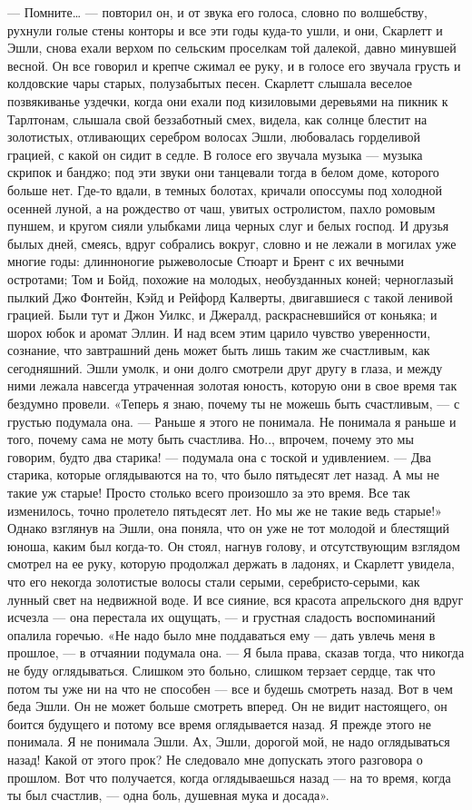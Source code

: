 — Помните… — повторил он, и от звука его голоса, словно по волшебству, рухнули голые стены конторы и все эти годы куда-то ушли, и они, Скарлетт и Эшли, снова ехали верхом по сельским проселкам той далекой, давно минувшей весной. Он все говорил и крепче сжимал ее руку, и в голосе его звучала грусть и колдовские чары старых, полузабытых песен. Скарлетт слышала веселое позвякиванье уздечки, когда они ехали под кизиловыми деревьями на пикник к Тарлтонам, слышала свой беззаботный смех, видела, как солнце блестит на золотистых, отливающих серебром волосах Эшли, любовалась горделивой грацией, с какой он сидит в седле. В голосе его звучала музыка — музыка скрипок и банджо; под эти звуки они танцевали тогда в белом доме, которого больше нет. Где-то вдали, в темных болотах, кричали опоссумы под холодной осенней луной, а на рождество от чаш, увитых остролистом, пахло ромовым пуншем, и кругом сияли улыбками лица черных слуг и белых господ. И друзья былых дней, смеясь, вдруг собрались вокруг, словно и не лежали в могилах уже многие годы: длинноногие рыжеволосые Стюарт и Брент с их вечными остротами; Том и Бойд, похожие на молодых, необузданных коней; черноглазый пылкий Джо Фонтейн, Кэйд и Рейфорд Калверты, двигавшиеся с такой ленивой грацией. Были тут и Джон Уилкс, и Джералд, раскрасневшийся от коньяка; и шорох юбок и аромат Эллин. И над всем этим царило чувство уверенности, сознание, что завтрашний день может быть лишь таким же счастливым, как сегодняшний.
Эшли умолк, и они долго смотрели друг другу в глаза, и между ними лежала навсегда утраченная золотая юность, которую они в свое время так бездумно провели.
«Теперь я знаю, почему ты не можешь быть счастливым, — с грустью подумала она. — Раньше я этого не понимала. Не понимала я раньше и того, почему сама не моту быть счастлива. Но.., впрочем, почему это мы говорим, будто два старика! — подумала она с тоской и удивлением. — Два старика, которые оглядываются на то, что было пятьдесят лет назад. А мы не такие уж старые! Просто столько всего произошло за это время. Все так изменилось, точно пролетело пятьдесят лет. Но мы же не такие ведь старые!» Однако взглянув на Эшли, она поняла, что он уже не тот молодой и блестящий юноша, каким был когда-то. Он стоял, нагнув голову, и отсутствующим взглядом смотрел на ее руку, которую продолжал держать в ладонях, и Скарлетт увидела, что его некогда золотистые волосы стали серыми, серебристо-серыми, как лунный свет на недвижной воде. И все сияние, вся красота апрельского дня вдруг исчезла — она перестала их ощущать, — и грустная сладость воспоминаний опалила горечью.
«Не надо было мне поддаваться ему — дать увлечь меня в прошлое, — в отчаянии подумала она. — Я была права, сказав тогда, что никогда не буду оглядываться. Слишком это больно, слишком терзает сердце, так что потом ты уже ни на что не способен — все и будешь смотреть назад. Вот в чем беда Эшли. Он не может больше смотреть вперед. Он не видит настоящего, он боится будущего и потому все время оглядывается назад. Я прежде этого не понимала. Я не понимала Эшли. Ах, Эшли, дорогой мой, не надо оглядываться назад! Какой от этого прок? Не следовало мне допускать этого разговора о прошлом. Вот что получается, когда оглядываешься назад — на то время, когда ты был счастлив, — одна боль, душевная мука и досада».
